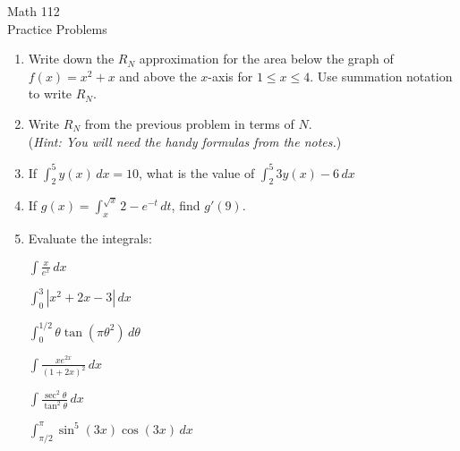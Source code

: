 \documentclass[11pt]{article}
\begin{document}
\begin{center}
\Large
\rm{Math 112}
\\
\rm{Practice Problems}
\\
\vspace{0.2in}

\end{center}


  \begin{enumerate}

  \item{Write down the $R_N$ approximation for the area below the graph of $f(x)=x^2+x$ and above the $x$-axis for $1\leq x \leq 4$.  Use summation notation to write $R_N$.}

  \item{Write $R_N$ from the previous problem in terms of $N$.\\
    (\emph{Hint: You will need the handy formulas from the notes.})}
    
    
\item{If  $\int_2^5 y(x)\,dx = 10$, what is the value of $\int_2^5 3y(x)-6\,dx$}

\item{If $g(x) = \int_{x}^{\sqrt{x}} 2-e^{-t}\,dt$, find $g'(9)$.}

    
  \item{Evaluate the integrals:

    $\int \frac{x}{e^{x}} \, dx$

\vspace{0.2in}
    
        $\int_0^{3} |x^2+2x-3| \, dx$

\vspace{0.2in}
    
        $\int_0^{1/2} \theta\tan{(\pi\theta^2)} \, d\theta$

\vspace{0.2in}
    
        $\int \frac{xe^{2x}}{(1+2x)^2} \, dx$

\vspace{0.2in}
    
        $\int \frac{\sec^2{\theta}}{\tan^2{\theta}} \, dx$

\vspace{0.2in}
    
        $\int_{\pi/2}^{\pi} \sin^5{(3x)}\cos{(3x)} \, dx$

}
\end{enumerate}
\end{document}
